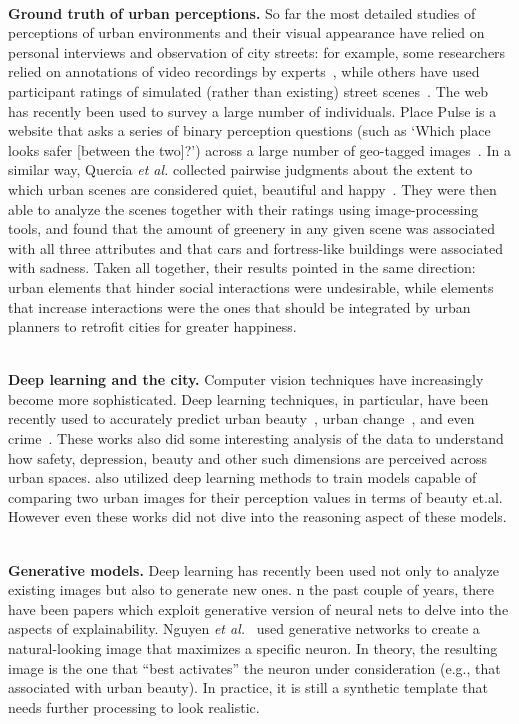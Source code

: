 \mbox{}\\
\noindent
\textbf{Ground truth of urban perceptions.} So far the most detailed studies of perceptions of urban environments and their visual appearance have relied on personal interviews and observation of city streets: for example, some researchers relied on annotations of video recordings by experts~\cite{sampson04seeing}, while others have used participant ratings of simulated (rather than existing) street scenes~\cite{lindal2012}. The web has recently been used to survey a large number of individuals. Place Pulse is a website that asks a series of binary perception questions (such as `Which place looks safer [between the two]?') across a large number of geo-tagged images~\cite{salesses2013collaborative}. In a similar way, Quercia \emph{et al.} collected pairwise judgments about the extent to which urban scenes are considered quiet, beautiful and happy~\cite{quercia2014aesthetic}. They were then able to analyze the scenes together with their ratings using image-processing tools, and found that the amount of greenery in any given scene was associated with all three attributes and that cars and fortress-like buildings were associated with sadness. Taken all together, their results pointed in the same direction: urban elements that hinder social interactions were undesirable, while elements that increase interactions were the ones that should be integrated by urban planners to retrofit cities for greater happiness. 

\mbox{}\\
\noindent
\textbf{Deep learning and the city.} Computer vision techniques have increasingly become more sophisticated. Deep learning techniques, in particular, have been recently used to accurately predict urban beauty~\cite{dubey2016deep,seresinhe2017using}, urban change~\cite{naik2017computer}, and even crime~\cite{DeNadai16}. These works also did some interesting analysis of the data to understand how safety, depression, beauty and other such dimensions are perceived across urban spaces.  \cite{dubey2016deep} also utilized deep learning methods to train models capable of comparing two urban images for their perception values in terms of beauty et.al. However even these works did not dive into the reasoning aspect of these models.

\mbox{}\\
\noindent
\textbf{Generative models.} Deep learning has recently been used not only to analyze existing images but also to generate new ones. n the past couple of years, there have been papers which exploit generative version of neural nets to delve into the aspects of explainability. Nguyen \emph{et al.}~\cite{nguyen2016synthesizing} used generative networks to create a natural-looking image that maximizes a specific neuron. In theory, the resulting image is the one that ``best activates'' the neuron under consideration (e.g., that associated with urban beauty). In practice, it is still a synthetic template that needs further processing to look realistic. \mbox{} \\

